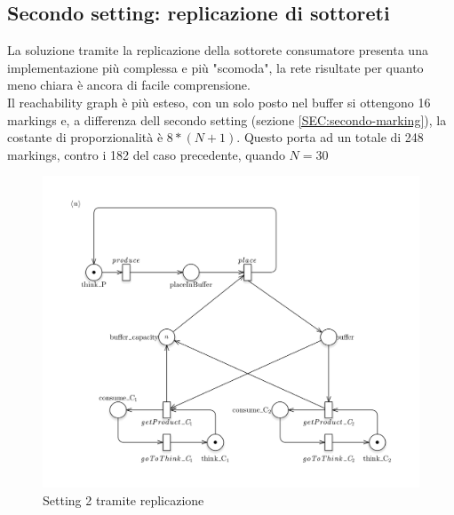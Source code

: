\documentclass{article}
\begin{document}
\subsection{Secondo  setting: replicazione di sottoreti}\label{SEC:secondo-replica}
La soluzione tramite la replicazione della sottorete consumatore presenta una implementazione più complessa e più "scomoda", la rete risultate per quanto meno chiara è ancora di facile comprensione.\\
Il reachability graph è più esteso, con un solo posto nel buffer si ottengono 16 markings e, a differenza dell secondo setting (sezione \ref{SEC:secondo-marking}), la costante di proporzionalità è $8*(N+1)$.
Questo porta ad un totale di 248 markings, contro i 182 del caso precedente, quando $N = 30$
\begin{figure}[!ht]
\centering
\includegraphics[width=\textwidth]{./Esercizio2_img/setting2_scale.png}
\caption{Setting 2 tramite replicazione} \label{FIG:setting2_scale}
\end{figure}

\newpage
\end{document}
